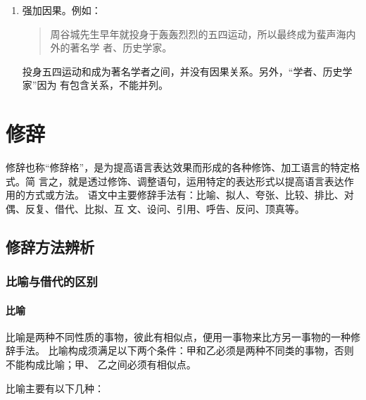 \documentclass[final,oneside]{ctexbook}
\newenvironment{equotation}{\begin{quotation}\kaishu}{\end{quotation}}
\begin{document}
\begin{enumerate}
    “鸦片战争以来的中国近代史，对于大多数中学生”主客颠倒，应改为“大多数中学生对
    于鸦片战争以来的中国近代史”。

  \item 强加因果。例如：

    \begin{equotation}
      周谷城先生早年就投身于轰轰烈烈的五四运动，所以最终成为蜚声海内外的著名学
      者、历史学家。
    \end{equotation}

    投身五四运动和成为著名学者之间，并没有因果关系。另外，“学者、历史学家”因为
    有包含关系，不能并列。

\end{enumerate}

\chapter{修辞}

 
修辞也称“修辞格”，是为提高语言表达效果而形成的各种修饰、加工语言的特定格式。简
言之，就是透过修饰、调整语句，运用特定的表达形式以提高语言表达作用的方式或方法。
语文中主要修辞手法有：比喻、拟人、夸张、比较、排比、对偶、反复、借代、比拟、互
文、设问、引用、呼告、反问、顶真等。

\section{修辞方法辨析}

\subsection{比喻与借代的区别}

\subsubsection{比喻}

比喻是两种不同性质的事物，彼此有相似点，便用一事物来比方另一事物的一种修辞手法。
比喻构成须满足以下两个条件：甲和乙必须是两种不同类的事物，否则不能构成比喻；甲、
乙之间必须有相似点。

比喻主要有以下几种：
\end{document}
